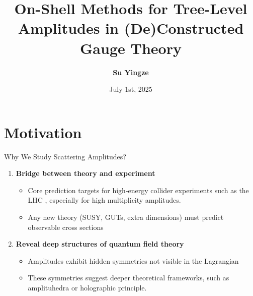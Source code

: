 \documentclass{beamer}
\title[Application of BCFW]{\Large On-Shell Methods for Tree-Level Amplitudes in (De)Constructed Gauge Theory}
\author[Su Yingze]{
  \textbf{Su Yingze}
}
\institute[E Lab]{
  \normalsize E Lab, Nagoya University
}
\date[$1^{\text{st}}$ July]{July 1st, 2025}
\begin{document}
\begin{frame} %
  \titlepage
\end{frame}
\section{Motivation}
\begin{frame}{Why We Study Scattering Amplitudes?}
  \begin{enumerate}
    \item \textbf{Bridge between theory and experiment}
    \begin{itemize}
      \item Core prediction targets for high-energy collider experiments such as the LHC , especially for high multiplicity amplitudes.
      \item Any new theory (SUSY, GUTs, extra dimensions) must predict observable cross sections
    \end{itemize}
    \pause
    \item \textbf{Reveal deep structures of quantum field theory}
    \begin{itemize}
      \item Amplitudes exhibit hidden symmetries not visible in the Lagrangian
      \item These symmetries suggest deeper theoretical frameworks, such as amplituhedra or holographic principle.
    \end{itemize}
  \end{enumerate}
\end{frame}
\end{document}
